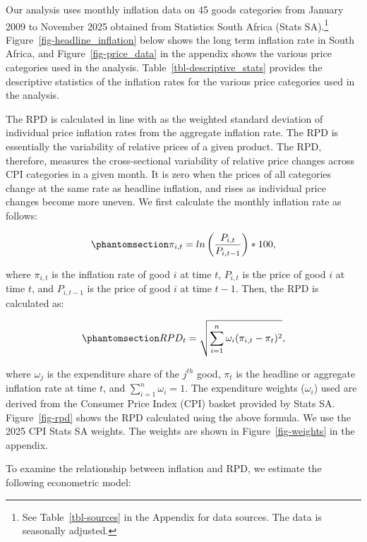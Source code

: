 \documentclass[
  letterpaper,
  DIV=11,
  numbers=noendperiod]{scrartcl}
\begin{document}
Our analysis uses monthly inflation data on 45 goods categories from
January 2009 to November 2025 obtained from Statistics South Africa
(Stats SA).\footnote{See Table~\ref{tbl-sources} in the Appendix for
  data sources. The data is seasonally adjusted.}
Figure~\ref{fig-headline_inflation} below shows the long term inflation
rate in South Africa, and Figure~\ref{fig-price_data} in the appendix
shows the various price categories used in the analysis.
Table~\ref{tbl-descriptive_stats} provides the descriptive statistics of
the inflation rates for the various price categories used in the
analysis.

The RPD is calculated in line with \citet{lach1992} as the weighted
standard deviation of individual price inflation rates from the
aggregate inflation rate. The RPD is essentially the variability of
relative prices of a given product. The RPD, therefore, measures the
cross-sectional variability of relative price changes across CPI
categories in a given month. It is zero when the prices of all
categories change at the same rate as headline inflation, and rises as
individual price changes become more uneven. We first calculate the
monthly inflation rate as follows:

\begin{equation}\phantomsection\label{eq-inflation_rate}{ \pi_{i,t} = ln\left(\frac{P_{i,t}}{P_{i,t-1}}\right) * 100, }\end{equation}

where \(\pi_{i,t}\) is the inflation rate of good \(i\) at time \(t\),
\(P_{i,t}\) is the price of good \(i\) at time \(t\), and \(P_{i,t-1}\)
is the price of good \(i\) at time \(t-1\). Then, the RPD is calculated
as:

\begin{equation}\phantomsection\label{eq-rpd}{RPD_{t} = \sqrt{\sum_{i=1}^{n}\omega_{i}(\pi_{i,t} - \pi_{t})^2}, }\end{equation}

where \(\omega_{j}\) is the expenditure share of the \(j^{th}\) good,
\(\pi_{t}\) is the headline or aggregate inflation rate at time \(t\),
and \(\sum_{i=1}^{n}\omega_{i} = 1\). The expenditure weights
(\(\omega_{i}\)) used are derived from the Consumer Price Index (CPI)
basket provided by Stats SA. Figure~\ref{fig-rpd} shows the RPD
calculated using the above formula. We use the 2025 CPI Stats SA
weights. The weights are shown in Figure~\ref{fig-weights} in the
appendix.

To examine the relationship between inflation and RPD, we estimate the
following econometric model:
\end{document}
